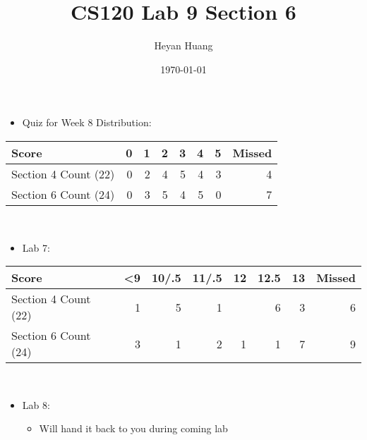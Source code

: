 \documentclass[presentation]{beamer}
\author{Heyan Huang}
\date{\today}
\title{CS120 Lab \alert{9} Section \alert{6}}
\begin{document}
\maketitle
\begin{itemize}
\item \alert{Quiz for Week 8} Distribution:
\end{itemize}
\begin{center}
\begin{tabular}{lrrrrrrr}
\hline
Score & 0 & 1 & 2 & 3 & 4 & 5 & Missed\\
\hline
Section \alert{4} Count (22) & 0 & 2 & 4 & 5 & 4 & 3 & 4\\
\hline
Section \alert{6} Count (24) & 0 & 3 & 5 & 4 & 5 & 0 & 7\\
\hline
\end{tabular}
\end{center}
\\
\begin{itemize}
\item \alert{Lab 7}:
\end{itemize}
\begin{center}
\begin{tabular}{lrrrrrrr}
\hline
Score & <9 & 10/.5 & 11/.5 & 12 & 12.5 & 13 & Missed\\
\hline
Section \alert{4} Count (22) & 1 & 5 & 1 &  & 6 & 3 & 6\\
\hline
Section \alert{6} Count (24) & 3 & 1 & 2 & 1 & 1 & 7 & 9\\
\hline
\end{tabular}
\end{center}
\\
\begin{itemize}
\item \alert{Lab 8}:
\begin{itemize}
\item Will hand it back to you during coming lab
\end{itemize}
\end{itemize}
\end{document}
